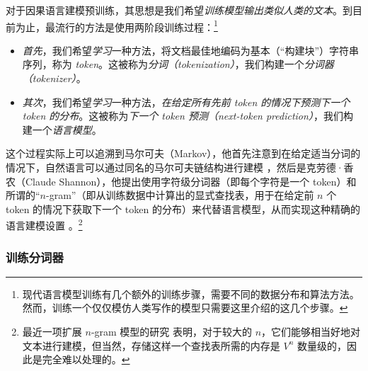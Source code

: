 \documentclass[../../book-main_zh.tex]{subfiles}
\begin{document}
对于因果语言建模预训练，其思想是我们希望\textit{训练模型输出类似人类的文本}。到目前为止，最流行的方法是使用两阶段训练过程：\footnote{现代语言模型训练有几个额外的训练步骤，需要不同的数据分布和算法方法。然而，训练一个仅仅模仿人类写作的模型只需要这里介绍的这几个步骤。}
\begin{itemize}
\item \textit{首先}，我们希望\textit{学习}一种方法，将文档最佳地编码为基本（“构建块”）字符串序列，称为 \textit{token}。这被称为\textit{分词（tokenization）}，我们构建一个\textit{分词器（tokenizer）}。
\item \textit{其次}，我们希望\textit{学习}一种方法，\textit{在给定所有先前 token 的情况下预测下一个 token 的分布}。这被称为\textit{下一个 token 预测（next-token prediction）}，我们构建一个\textit{语言模型}。
\end{itemize}
这个过程实际上可以追溯到马尔可夫（Markov），他首先注意到在给定适当分词的情况下，自然语言可以通过同名的马尔可夫链结构进行建模 \citep{markov2006example}，然后是克劳德·香农（Claude Shannon），他提出使用字符级分词器（即每个字符是一个 token）和所谓的“\(n\)-gram”（即从训练数据中计算出的显式查找表，用于在给定前 \(n\) 个 token 的情况下获取下一个 token 的分布）来代替语言模型，从而实现这种精确的语言建模设置 \citep{Shannon-1948}。\footnote{最近一项扩展 \(n\)-gram 模型的研究 \citep{liu2024infini} 表明，对于较大的 \(n\)，它们能够相当好地对文本进行建模，但当然，存储这样一个查找表所需的内存是 \(V^{n}\) 数量级的，因此是完全难以处理的。}

\subsubsection{训练分词器}
\end{document}
